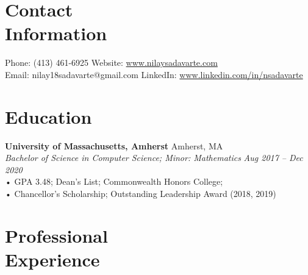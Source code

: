 \documentclass[margin,line]{resume}
\begin{document}
\begin{resume}
    \section{\mysidestyle Contact\\Information}

    Phone: (413) 461-6925     \hfill Website: \url{www.nilaysadavarte.com}
    \\
    \noindent Email: nilay18sadavarte@gmail.com  \hfill LinkedIn: \url{www.linkedin.com/in/nsadavarte}
    \\
    \vspace{-4.5mm}

    \section{\mysidestyle Education}

    \textbf{University of Massachusetts, Amherst} \hfill Amherst, MA
    \\
    \textsl{Bachelor of Science in Computer Science; Minor: Mathematics} \hfill \textsl{Aug 2017 -- Dec 2020} 
    \\
    • GPA 3.48; Dean’s List; Commonwealth Honors College;
    \\
    • Chancellor’s Scholarship; Outstanding Leadership Award (2018, 2019)

    \section{\mysidestyle Professional\\Experience}


\end{resume}
\end{document}
